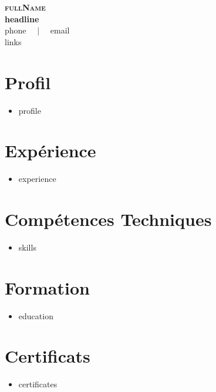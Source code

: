 \documentclass[letterpaper,10pt]{article}
\newcommand{\resumeItem}[1]{\item\small{{#1}}}
\newcommand{\resumeListStart}{\begin{itemize}[leftmargin=0.18in, label={}, itemsep=1.2pt, topsep=2.5pt, parsep=0pt]}
\newcommand{\resumeListEnd}{\end{itemize}\vspace{-2pt}}
\begin{document}
\begin{center}
    \textbf{\Huge \scshape \color{navy} {{fullName}}} \\[3pt]
    \small \textbf{\color{accent} {{headline}}} \\[3pt]
    \footnotesize \color{greytext}
    {{phone}} $\quad|\quad$ {{email}} \\[2pt]
    {{links}}
\end{center}
\vspace{4pt}

\section{Profil}
\resumeListStart
\resumeItem{ {{profile}} }
\resumeListEnd
\vspace{-2pt}

\section{Expérience}
\resumeListStart
\resumeItem{ {{experience}} }
\resumeListEnd

\section{Compétences Techniques}
\resumeListStart
\resumeItem{ {{skills}} }
\resumeListEnd

\section{Formation}
\resumeListStart
\resumeItem{ {{education}} }
\resumeListEnd

\section{Certificats}
\resumeListStart
\resumeItem{ {{certificates}} }
\resumeListEnd
\end{document}
